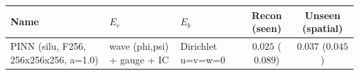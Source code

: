 \begin{center}
\begin{tabular}{lll cc}
\toprule
Name & $E_r$ & $E_b$ & Recon (seen) & Unseen (spatial) \\
\midrule
PINN (silu, F256, 256x256x256, a=1.0) & wave (phi,psi) + gauge + IC & Dirichlet u=v=w=0 & $0.025$ ($0.089$) & $0.037$ ($0.045$) \\
\bottomrule
\end{tabular}
\end{center}
